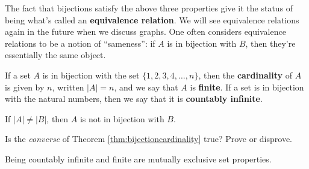 \begin{remark} The fact that bijections satisfy the above three properties give it the status of being what's called an \textbf{equivalence relation}.  We will see equivalence relations again in the future when we discuss graphs.  One often considers equivalence relations to be a notion of ``sameness'': if $A$ is in bijection with $B$, then they're essentially the same object.
\end{remark}

\begin{definition} If a set $A$ is in bijection with the set $\{1, 2, 3, 4, \ldots, n\}$, then the \textbf{cardinality} of $A$ is given by $n$, written $|A| = n$, and we say that $A$ is \textbf{finite}.  If a set is in bijection with the natural numbers, then we say that it is \textbf{countably infinite}.\end{definition}

\begin{theorem} \label{thm:bijectioncardinality} If $|A|\neq |B|$, then $A$ is not in bijection with $B$. \end{theorem}

\begin{question} Is the \textit{converse} of Theorem \ref{thm:bijectioncardinality} true?  Prove or disprove.
\end{question}

\begin{theorem} Being countably infinite and finite are mutually exclusive set properties. \end{theorem}




